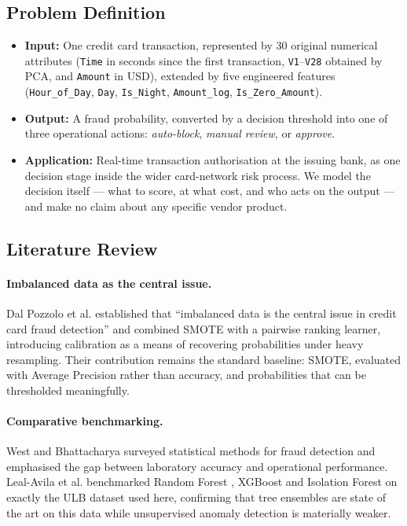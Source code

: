 \subsection{Problem Definition}

\begin{itemize}
    \item \textbf{Input:} One credit card transaction, represented by 30 original
    numerical attributes (\texttt{Time} in seconds since the first transaction,
    \texttt{V1}--\texttt{V28} obtained by PCA, and \texttt{Amount} in USD),
    extended by five engineered features (\texttt{Hour\_of\_Day}, \texttt{Day},
    \texttt{Is\_Night}, \texttt{Amount\_log}, \texttt{Is\_Zero\_Amount}).
    \item \textbf{Output:} A fraud probability, converted by a decision
    threshold into one of three operational actions: \emph{auto-block},
    \emph{manual review}, or \emph{approve}.
    \item \textbf{Application:} Real-time transaction authorisation at the
    issuing bank, as one decision stage inside the wider card-network risk
    process. We model the decision itself --- what to score, at what cost, and
    who acts on the output --- and make no claim about any specific vendor
    product.
\end{itemize}

\subsection{Literature Review}

\paragraph*{Imbalanced data as the central issue.}
Dal Pozzolo et al. \cite{DalPozzolo2014} established that ``imbalanced data is
the central issue in credit card fraud detection'' and combined SMOTE with a
pairwise ranking learner, introducing calibration as a means of recovering
probabilities under heavy resampling. Their contribution remains the standard
baseline: SMOTE, evaluated with Average Precision rather than accuracy, and
probabilities that can be thresholded meaningfully.

\paragraph*{Comparative benchmarking.}
West and Bhattacharya \cite{West2016} surveyed statistical methods for fraud
detection and emphasised the gap between laboratory accuracy and operational
performance. Leal-Avila et al. \cite{LealAvila2023} benchmarked Random Forest
\cite{Breiman2001}, XGBoost \cite{Jian2013} and Isolation Forest on exactly the
ULB dataset used here, confirming that tree ensembles are state of the art on
this data while unsupervised anomaly detection is materially weaker.

